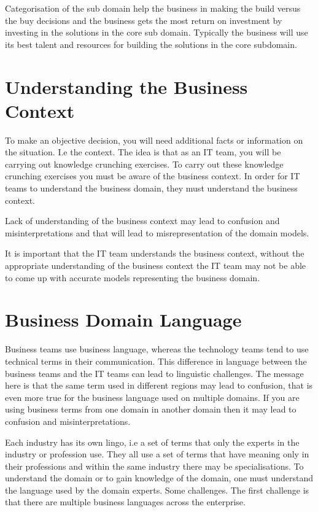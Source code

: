 Categorisation of the sub domain help the business in making the build versus the buy decisions and the business gets the most return on investment by investing in the solutions in the core sub domain.
Typically the business will use its best talent and resources for building the solutions in the core subdomain.

\section{Understanding the Business Context}
To make an objective decision, you will need additional facts or information on the situation.
I.e the context.
The idea is that as an IT team, you will be carrying out knowledge crunching exercises.
To carry out these knowledge crunching exercises you must be aware of the business context.
In order for IT teams to understand the business domain, they must understand the business context.

Lack of understanding of the business context may lead to confusion and misinterpretations and that will lead to misrepresentation of the domain models.

It is important that the IT team understands the business context, without the appropriate understanding of the business context the IT team may not be able to come up with accurate models representing the business domain.


\section{Business Domain Language}
Business teams use business language, whereas the technology teams tend to use technical terms in their communication.
This difference in language between the business teams and the IT teams can lead to linguistic challenges.
The message here is that the same term used in different regions may lead to confusion, that is even more true for the business language used on multiple domains.
If you are using business terms from one domain in another domain then it may lead to confusion and misinterpretations.

Each industry has its own lingo, i.e  a set of terms that only the experts in the industry or profession use.
They all use a set of terms that have meaning only in their professions and within the same industry there may be specialisations.
To understand the domain or to gain knowledge of the domain, one must understand the language used by the domain experts.
Some challenges.
The first challenge is that there are multiple business languages across the enterprise.

